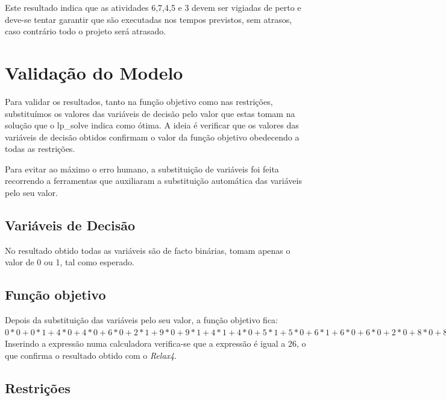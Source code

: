 Este resultado indica que as atividades 6,7,4,5 e 3 devem ser vigiadas de perto
e deve-se tentar garantir que são executadas nos tempos previstos, sem atrasos,
caso contrário todo o projeto será atrasado.

\section{Validação do Modelo}

Para validar os resultados, tanto na função objetivo como nas restrições,
substituímos os valores das variáveis de decisão pelo valor que estas tomam na
solução que o lp\_solve indica como ótima. A ideia é verificar que os valores
das variáveis de decisão obtidos confirmam o valor da função objetivo obedecendo
a todas as restrições.

Para evitar ao máximo o erro humano, a substituição de variáveis foi feita
recorrendo a ferramentas que auxiliaram a substituição automática das variáveis
pelo seu valor.

\subsection{Variáveis de Decisão}

No resultado obtido todas as variáveis são de facto binárias, tomam apenas
o valor de 0 ou 1, tal como esperado.

\subsection{Função objetivo}

Depois da substituição das variáveis pelo seu valor, a função objetivo
fica:\\[0.5cm]

$0*0+0*1+4*0+4*0+6*0+2*1+9*0+9*1+4*1+4*0+5*1
+5*0+6*1+6*0+6*0+2*0+8*0+8*0+8*0+7*0 = 26$\\[0.5cm]

Inserindo a expressão numa calculadora verifica-se que a expressão é igual a 26,
o que confirma o resultado obtido com o \emph{Relax4}.

\subsection{Restrições}

